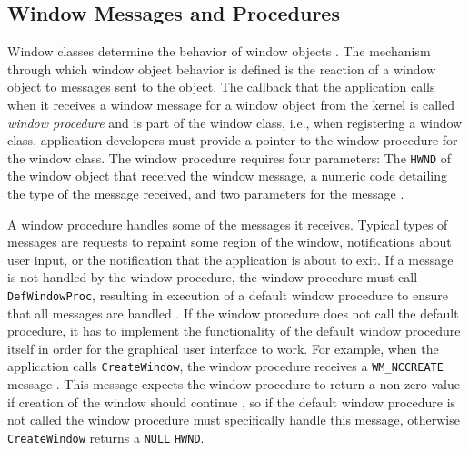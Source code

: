 		\subsection{Window Messages and Procedures}
			Window classes determine the behavior of window objects \cite{creatingwindow}. The mechanism
			through which window object behavior is defined is the reaction of
			a window object to messages sent to the object. The callback that
			the application calls when it receives a window message
			for a window object from the kernel is called
			\textit{window procedure} \cite{aboutwinproc} and is part of the window class, i.e., when
			registering a window class, application developers must provide a
			pointer to the window procedure for the window class. The window
			procedure requires four parameters: The \texttt{HWND} of the window
			object that received the window message, a numeric code detailing the
			type of the message received, and two parameters for the message
			\cite{aboutwinproc}.

			A window procedure handles some of the messages it receives.
			Typical types of messages are requests to repaint some region of
			the window, notifications about user input, or the notification
			that the application is about to exit. If a message is not handled
			by the window procedure, the window procedure must call
			\texttt{DefWindowProc}, resulting in execution of a default window
			procedure to ensure that all messages are handled
			\cite{aboutwinproc}. If the window procedure does not call the
			default procedure, it has to implement the functionality of the
			default window procedure itself in order for the graphical user
			interface to work. For example, when the application calls
			\texttt{CreateWindow},
			the window procedure receives a \texttt{WM\_NCCREATE}
			message \cite{createwindow}. This message expects the window procedure
			to return a non-zero value if creation of the window should continue
			\cite{wmnccreate},
			so if the default window procedure is not called the window procedure
			must specifically handle this message, otherwise \texttt{CreateWindow}
			returns a \texttt{NULL} \texttt{HWND}.

